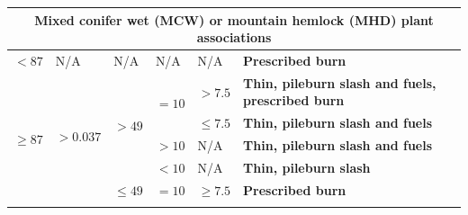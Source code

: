 \begin{longtable}{p{.1\linewidth}p{.1\linewidth}p{.15\linewidth}p{.15\linewidth}p{.2\linewidth}p{.25\linewidth}}
\multicolumn{6}{c}{\textbf{Mixed conifer wet (MCW) or mountain hemlock (MHD) plant associations}}                                                                                                                                                                                                                                                                     \\ \hline
$<87$                       & N/A                                                    & N/A                                                 & N/A                  & N/A                                                                                                     & \textbf{Prescribed burn}                                                          \\ \hline
\multirow{7}{*}{$\ge 87$}  & \multirow{5}{*}{$>0.037$}                     & \multirow{4}{*}{$>49$}                     & \multirow{2}{*}{$=10$} & $>7.5$                                                                                         & \textbf{Thin, pileburn slash and fuels, prescribed burn}                          \\ \cline{5-6} 
                                  &                                                        &                                                     &                      & $ \le 7.5$                                                                                          & \textbf{Thin, pileburn slash and fuels}                                           \\ \cline{4-6} 
                                  &                                                        &                                                     & $>10$       & N/A                                                                                                     & \textbf{Thin, pileburn slash and fuels}                                           \\ \cline{4-6} 
                                  &                                                        &                                                     & $< 10$         & N/A                                                                                                     & \textbf{Thin, pileburn slash}                                                     \\ \cline{3-6} 
                                  &                                                        & $ \le 49$                                       & $=10$                  & $ \ge 7.5$                                                                                       & \textbf{Prescribed burn}                                                          \\ \cline{2-6} 

\end{longtable}
